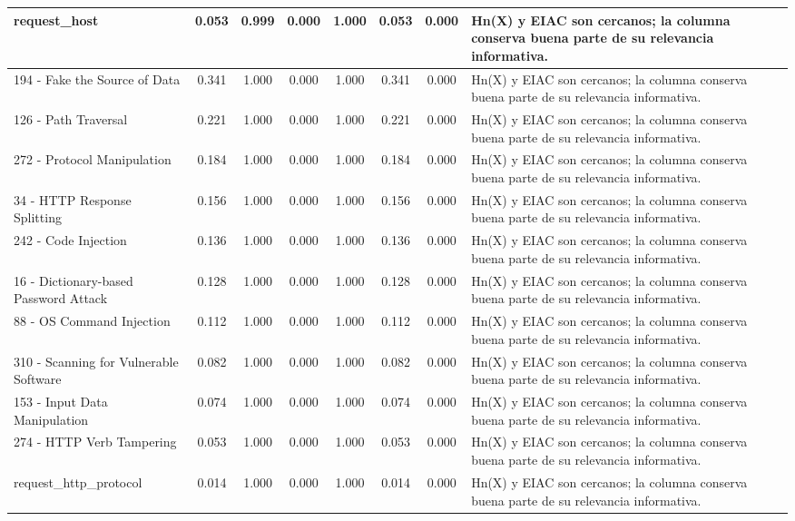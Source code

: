 \begin{table}[h]
\begin{tabular}{|p{3cm}|c|c|c|c|c|c|p{5cm}|}
\hline
request\_host & 0.053 & 0.999 & 0.000 & 1.000 & 0.053 & 0.000 & Hn(X) y EIAC son cercanos; la columna conserva buena parte de su relevancia informativa. \\
\hline
194 - Fake the Source of Data & 0.341 & 1.000 & 0.000 & 1.000 & 0.341 & 0.000 & Hn(X) y EIAC son cercanos; la columna conserva buena parte de su relevancia informativa. \\
\hline
126 - Path Traversal & 0.221 & 1.000 & 0.000 & 1.000 & 0.221 & 0.000 & Hn(X) y EIAC son cercanos; la columna conserva buena parte de su relevancia informativa. \\
\hline
272 - Protocol Manipulation & 0.184 & 1.000 & 0.000 & 1.000 & 0.184 & 0.000 & Hn(X) y EIAC son cercanos; la columna conserva buena parte de su relevancia informativa. \\
\hline
34 - HTTP Response Splitting & 0.156 & 1.000 & 0.000 & 1.000 & 0.156 & 0.000 & Hn(X) y EIAC son cercanos; la columna conserva buena parte de su relevancia informativa. \\
\hline
242 - Code Injection & 0.136 & 1.000 & 0.000 & 1.000 & 0.136 & 0.000 & Hn(X) y EIAC son cercanos; la columna conserva buena parte de su relevancia informativa. \\
\hline
16 - Dictionary-based Password Attack & 0.128 & 1.000 & 0.000 & 1.000 & 0.128 & 0.000 & Hn(X) y EIAC son cercanos; la columna conserva buena parte de su relevancia informativa. \\
\hline
88 - OS Command Injection & 0.112 & 1.000 & 0.000 & 1.000 & 0.112 & 0.000 & Hn(X) y EIAC son cercanos; la columna conserva buena parte de su relevancia informativa. \\
\hline
310 - Scanning for Vulnerable Software & 0.082 & 1.000 & 0.000 & 1.000 & 0.082 & 0.000 & Hn(X) y EIAC son cercanos; la columna conserva buena parte de su relevancia informativa. \\
\hline
153 - Input Data Manipulation & 0.074 & 1.000 & 0.000 & 1.000 & 0.074 & 0.000 & Hn(X) y EIAC son cercanos; la columna conserva buena parte de su relevancia informativa. \\
\hline
274 - HTTP Verb Tampering & 0.053 & 1.000 & 0.000 & 1.000 & 0.053 & 0.000 & Hn(X) y EIAC son cercanos; la columna conserva buena parte de su relevancia informativa. \\
\hline
request\_http\_protocol & 0.014 & 1.000 & 0.000 & 1.000 & 0.014 & 0.000 & Hn(X) y EIAC son cercanos; la columna conserva buena parte de su relevancia informativa. \\
\hline

\end{tabular}
\end{table}
